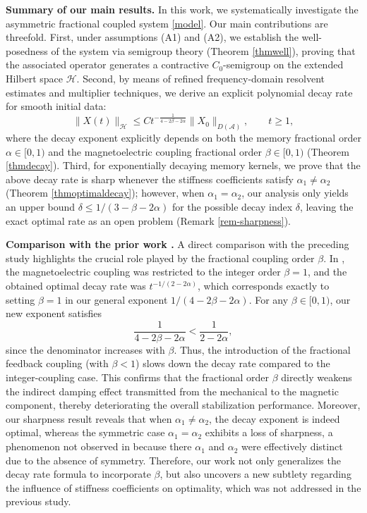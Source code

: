 \documentclass[12pt,reqno]{article}
\begin{document}
\noindent\textbf{Summary of our main results.} In this work, we systematically investigate the asymmetric fractional coupled system \eqref{model}. Our main contributions are threefold. First, under assumptions (A1) and (A2), we establish the well-posedness of the system via semigroup theory (Theorem \ref{thmwell}), proving that the associated operator generates a contractive \(C_0\)-semigroup on the extended Hilbert space \(\mathcal{H}\). Second, by means of refined frequency-domain resolvent estimates and multiplier techniques, we derive an explicit polynomial decay rate for smooth initial data:
\[
\|X(t)\|_{\mathcal{H}} \le C t^{-\frac{1}{4-2\beta-2\alpha}} \|X_0\|_{D(\mathcal{A})}, \qquad t\ge 1,
\]
where the decay exponent explicitly depends on both the memory fractional order \(\alpha\in[0,1)\) and the magnetoelectric coupling fractional order \(\beta\in[0,1)\) (Theorem \ref{thmdecay}). Third, for exponentially decaying memory kernels, we prove that the above decay rate is sharp whenever the stiffness coefficients satisfy \(\alpha_1\ne \alpha_2\) (Theorem \ref{thmoptimaldecay}); however, when \(\alpha_1=\alpha_2\), our analysis only yields an upper bound \(\delta \le 1/(3-\beta-2\alpha)\) for the possible decay index $\delta$, leaving the exact optimal rate as an open problem (Remark \ref{rem-sharpness}).

\medskip
\noindent\textbf{Comparison with the prior work \cite{MR4939108}.}
A direct comparison with the preceding study highlights the crucial role played by the fractional coupling order \(\beta\). In \cite{MR4939108}, the magnetoelectric coupling was restricted to the integer order \(\beta=1\), and the obtained optimal decay rate was \(t^{-1/(2-2\alpha)}\), which corresponds exactly to setting \(\beta=1\) in our general exponent \(1/(4-2\beta-2\alpha)\). For any \(\beta\in[0,1)\), our new exponent satisfies
\[
\frac{1}{4-2\beta-2\alpha} < \frac{1}{2-2\alpha},
\]
since the denominator increases with \(\beta\). Thus, the introduction of the fractional feedback coupling (with \(\beta<1\)) slows down the decay rate compared to the integer-coupling case. This confirms that the fractional order \(\beta\) directly weakens the indirect damping effect transmitted from the mechanical to the magnetic component, thereby deteriorating the overall stabilization performance. Moreover, our sharpness result reveals that when \(\alpha_1\ne\alpha_2\), the decay exponent is indeed optimal, whereas the symmetric case \(\alpha_1=\alpha_2\) exhibits a loss of sharpness, a phenomenon not observed in \cite{MR4939108} because there \(\alpha_1\) and \(\alpha_2\) were effectively distinct due to the absence of symmetry. Therefore, our work not only generalizes the decay rate formula to incorporate \(\beta\), but also uncovers a new subtlety regarding the influence of stiffness coefficients on optimality, which was not addressed in the previous study.
		
\end{document}
